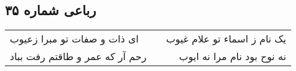 \begin{center}
\section*{رباعی شماره ۳۵}
\label{sec:sh035}
\begin{longtable}{l p{0.5cm} r}
ای ذات و صفات تو مبرا زعیوب
&&
یک نام ز اسماء تو علام غیوب
\\
رحم آر که عمر و طاقتم رفت بباد
&&
نه نوح بود نام مرا نه ایوب
\\
\end{longtable}
\end{center}

